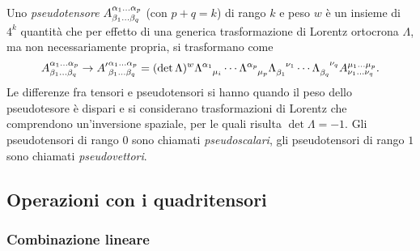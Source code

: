 Uno \emph{pseudotensore}
$\tensor*{A}{^{\alpha_{1}\dots\alpha_{p}}_{\beta_{1}\dots\beta_{q}}}$ (con
$p+q=k$) di rango $k$ e peso $w$ è un insieme di $4^{k}$ quantità che per
effetto di una generica trasformazione di Lorentz ortocrona $\Lambda$, ma non
necessariamente propria, si trasformano come
\begin{equation}
  \tensor*{A}{^{\alpha_{1}\dots\alpha_{p}}_{\beta_{1}\dots\beta_{q}}} \to
  \tensor*{{A'}}{^{\alpha_{1}\dots\alpha_{p}}_{\beta_{1}\dots\beta_{q}}}
  = (\det \Lambda)^{w} \tensor{\Lambda}{^{\alpha_{1}}_{\mu_{i}}} \cdots
  \tensor{\Lambda}{^{\alpha_{p}}_{\mu_{p}}}
  \tensor{\Lambda}{_{\beta_{1}}^{\nu_{1}}} \cdots
  \tensor{\Lambda}{_{\beta_{q}}^{\nu_{q}}}
  \tensor*{A}{^{\mu_{1}\dots\mu_{p}}_{\nu_{1}\dots\nu_{q}}}.
\end{equation}
Le differenze fra tensori e pseudotensori si hanno quando il peso dello
pseudotesore è dispari e si considerano trasformazioni di Lorentz che
comprendono un'inversione spaziale, per le quali risulta $\det\Lambda = -1$.
Gli pseudotensori di rango $0$ sono chiamati \emph{pseudoscalari}, gli
pseudotensori di rango $1$ sono chiamati \emph{pseudovettori}.

\subsection{Operazioni con i quadritensori}
\label{sec:operazioni-tensori}

\subsubsection{Combinazione lineare}
\label{sec:combinazione-lineare}

